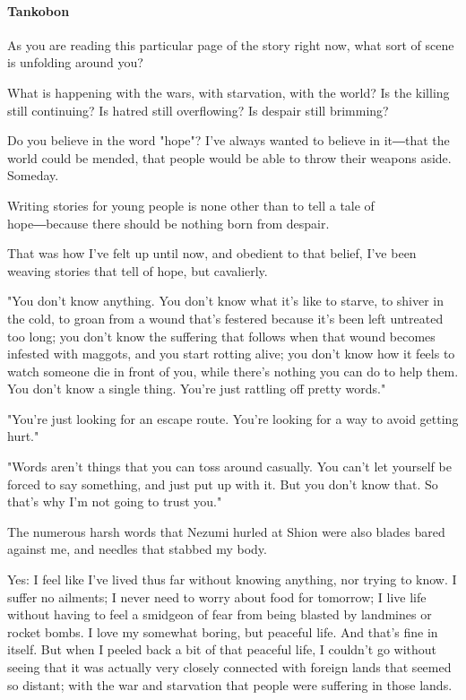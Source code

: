 \paragraph{Tankobon}

As you are reading this particular page of the story right now, what
sort of scene is unfolding around you?

What is happening with the wars, with starvation, with the world? Is the
killing still continuing? Is hatred still overflowing? Is despair still
brimming?

Do you believe in the word "hope"? I've always wanted to believe in
it―that the world could be mended, that people would be able to throw
their weapons aside. Someday.

Writing stories for young people is none other than to tell a tale of
hope―because there should be nothing born from despair.

That was how I've felt up until now, and obedient to that belief, I've
been weaving stories that tell of hope, but cavalierly.

"You don't know anything. You don't know what it's like to starve, to
shiver in the cold, to groan from a wound that's festered because it's
been left untreated too long; you don't know the suffering that follows
when that wound becomes infested with maggots, and you start rotting
alive; you don't know how it feels to watch someone die in front of you,
while there's nothing you can do to help them. You don't know a single
thing. You're just rattling off pretty words."

"You're just looking for an escape route. You're looking for a way to
avoid getting hurt."

"Words aren't things that you can toss around casually. You can't let
yourself be forced to say something, and just put up with it. But you
don't know that. So that's why I'm not going to trust you."

The numerous harsh words that Nezumi hurled at Shion were also blades
bared against me, and needles that stabbed my body.

Yes: I feel like I've lived thus far without knowing anything, nor
trying to know. I suffer no ailments; I never need to worry about food
for tomorrow; I live life without having to feel a smidgeon of fear from
being blasted by landmines or rocket bombs. I love my somewhat boring,
but peaceful life. And that's fine in itself. But when I peeled back a
bit of that peaceful life, I couldn't go without seeing that it was
actually very closely connected with foreign lands that seemed so
distant; with the war and starvation that people were suffering in those
lands.

